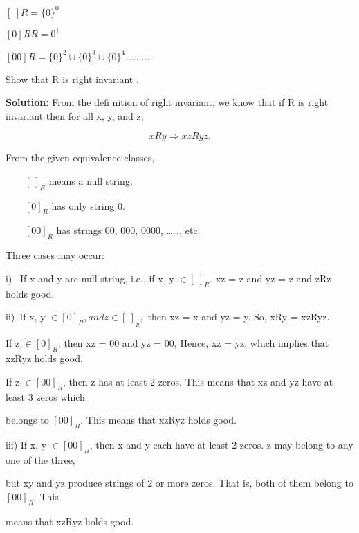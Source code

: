\documentclass[10pt,a4paper]{book}
\begin{document}
$[ \:] R = \{0\}^{0}$

$[ 0 ]RR = {0}^{1}$

$[00]R = \{0\}^{2} \cup \{0\}^{3} \cup \{0\}^{4} ……….$

Show that R is right invariant .

\begin{flushleft}
  \qquad\textbf{\textsf{Solution:}} From the defi nition of right invariant, we know that if R is right invariant then for
all x, y, and z,
\end{flushleft}

$$ xRy \Rightarrow xzRyz. $$

From the given equivalence classes,

$\qquad [\: ]_{R} $ means a null string.

$\qquad[0]_{R} $ has only string 0.

$\qquad[00]_{R} $ has strings 00, 000, 0000, ……, etc.

\quad \tiny
\quad

Three cases may occur:

i) \, If x and y are null string, i.e., if x, y $\in [\: ]_{R}$. xz = z and yz = z and zRz holds good.

ii) \,If x, y $\in [0]_{R}, and z \in [ \:]_{_{R}},$ then xz = x and yz = y. So, xRy = xzRyz.

\qquad If z $\in [0]_{R}$, then xz = 00 and yz = 00, Hence, xz = yz, which implies that xzRyz holds good.

\qquad If z $\in [00]_{R}$, then z has at least 2 zeros. This means that xz and yz have at least 3 zeros which

belongs to $[00]_{R}$. This means that xzRyz holds good.

iii) If x, y $\in [00]_{R}$, then x and y each have at least 2 zeros. z may belong to any one of the three,

\qquad but xy and yz produce strings of 2 or more zeros. That is, both of them belong to $[00]_{R}$. This

\qquad means that xzRyz holds good.
\end{document}
